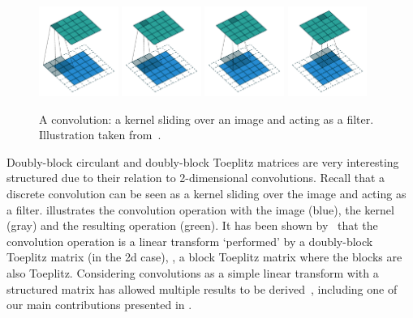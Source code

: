 \begin{figure}[ht]
  \centering
  \includegraphics[width=0.23\textwidth]{figures/main/ch2-background/conv_00.pdf}
  \hfill
  \includegraphics[width=0.23\textwidth]{figures/main/ch2-background/conv_01.pdf}
  \hfill
  \includegraphics[width=0.23\textwidth]{figures/main/ch2-background/conv_02.pdf}
  \hfill
  \includegraphics[width=0.23\textwidth]{figures/main/ch2-background/conv_03.pdf}
  \caption{A convolution: a kernel sliding over an image and acting as a filter. \\Illustration taken from~\citet{dumoulin2016guide}.}
  \label{figure:illustration_convolution}
\end{figure}

Doubly-block circulant and doubly-block Toeplitz matrices are very interesting structured due to their relation to 2-dimensional convolutions.
Recall that a discrete convolution can be seen as a kernel sliding over the image and acting as a filter.
 illustrates the convolution operation with the image (blue), the kernel (gray) and the resulting operation (green).
It has been shown by~\citet{jain1989fundamentals} that the convolution operation is a linear transform `performed' by a doubly-block Toeplitz matrix (in the 2d case), \ie, a block Toeplitz matrix where the blocks are also Toeplitz.
Considering convolutions as a simple linear transform with a structured matrix has allowed multiple results to be derived~\citet{appuswamy2016structured,wang2020orthogonal,sedghi2018singular,singla2019bounding}, including one of our main contributions presented in .




